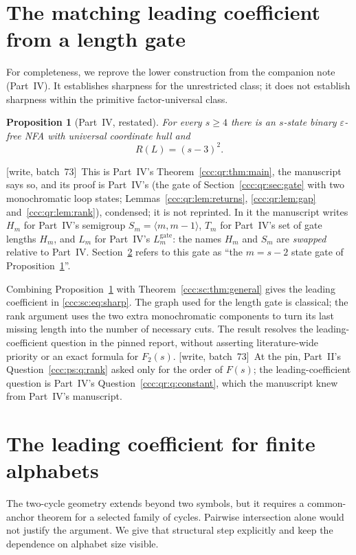 \documentclass[11pt,letterpaper]{article}
\newtheorem{proposition}[theorem]{Proposition}
\theoremstyle{definition}
\theoremstyle{remark}
\newcommand{\eps}{\varepsilon}
\newcommand{\Lgate}[1]{L^{\mathrm{gate}}_{#1}}
\newcommand{\wsevthree}{\textup{[write, batch~73]}}
\begin{document}
\section{The matching leading coefficient from a length gate}\label{ccc:sc:sec:lower}

For completeness, we reprove the lower construction from the companion note (Part~IV). It establishes sharpness for the unrestricted class; it does not establish sharpness within the primitive factor-universal class.

\begin{proposition}[Part~IV, restated]\label{ccc:sc:prop:lower}
For every $s\ge4$ there is an $s$-state binary $\eps$-free NFA with universal coordinate hull and
\[
 R(L)=(s-3)^2.
\]
\end{proposition}
\noindent\wsevthree\ This is Part~IV's Theorem~\ref{ccc:qr:thm:main}, the
manuscript says so, and its proof is Part~IV's (the gate of
Section~\ref{ccc:qr:sec:gate} with two monochromatic loop states;
Lemmas~\ref{ccc:qr:lem:returns}, \ref{ccc:qr:lem:gap}
and~\ref{ccc:qr:lem:rank}), condensed; it is not reprinted. In it the
manuscript writes $H_m$ for Part~IV's semigroup $S_m=\langle m,m-1\rangle$,
$T_m$ for Part~IV's set of gate lengths $H_m$, and $L_m$ for Part~IV's
$\Lgate m$: the names $H_m$ and $S_m$ are \emph{swapped} relative to
Part~IV. Section~\ref{ccc:sc:sec:alphabet} refers to this gate as ``the
$m=s-2$ state gate of Proposition~\ref{ccc:sc:prop:lower}''.


Combining Proposition~\ref{ccc:sc:prop:lower} with Theorem~\ref{ccc:sc:thm:general} gives the leading coefficient in \eqref{ccc:sc:eq:sharp}. The graph used for the length gate is classical; the rank argument uses the two extra monochromatic components to turn its last missing length into the number of necessary cuts. The result resolves the leading-coefficient question in the pinned report, without asserting literature-wide priority or an exact formula for $F_2(s)$.
\wsevthree\ At the pin, Part~II's Question~\ref{ccc:ps:q:rank} asked only for
the order of $F(s)$; the leading-coefficient question is Part~IV's
Question~\ref{ccc:qr:q:constant}, which the manuscript knew from Part~IV's
manuscript.
\section{The leading coefficient for finite alphabets}\label{ccc:sc:sec:alphabet}

The two-cycle geometry extends beyond two symbols, but it requires a common-anchor theorem for a selected family of cycles. Pairwise intersection alone would not justify the argument. We give that structural step explicitly and keep the dependence on alphabet size visible.
\end{document}
